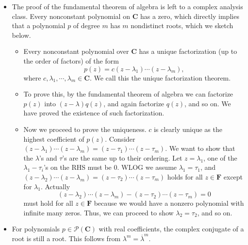 \documentclass[11pt]{article}
\newcommand{\C}{\mathbf{C}}
\newcommand{\F}{\mathbf{F}}
\newcommand{\conj}[1]{\overline{#1}}
\begin{document}
\begin{itemize}
    \item The proof of the fundamental theorem of algebra is left to a complex analysis class. Every nonconstant polynomial on $\C$ has a zero, which directly implies that a polynomial $p$ of degree $m$ has $m$ nondistinct roots, which we sketch below.
    \begin{itemize}
        \item Every nonconstant polynomial over $\C$ has a unique factorization (up to the order of factors) of the form 
        \begin{equation}
            p(z) = c(z - \lambda_1)\cdots(z-\lambda_m), \tag{$\star$}
        \end{equation}
        where $c, \lambda_1,\cdots,\lambda_m \in \C$. We call this the unique factorization theorem.
    \end{itemize}
    \begin{itemize}
        \item To prove this, by the fundamental theorem of algebra we can factorize $p(z)$ into $(z-\lambda)q(z)$, and again factorize $q(z)$, and so on. We have proved the existence of such factorization.
        \item Now we proceed to prove the uniqueness. $c$ is clearly unique as the highest coefficient of $p(z)$. Consider $(z - \lambda_1)\cdots(z-\lambda_m)=(z - \tau_1)\cdots(z-\tau_m)$. We want to show that the $\lambda$'s and $\tau$'s are the same up to their ordering. Let $z = \lambda_1$, one of the $\lambda_1 - \tau_i$'s on the RHS must be 0. WLOG we assume $\lambda_1 = \tau_1$, and $(z - \lambda_2)\cdots(z-\lambda_m)=(z - \tau_2)\cdots(z-\tau_m)$ holds for all $z \in \F$ except for $\lambda_1$. Actually $$(z - \lambda_2)\cdots(z-\lambda_m) - (z - \tau_2)\cdots(z-\tau_m) = 0$$ must hold for all $z \in \F$ because we would have a nonzero polynomial with infinite many zeros. Thus, we can proceed to show $\lambda_2 = \tau_2$, and so on.
    \end{itemize}
    \item For polynomials $p \in \mathcal{P}(\C)$ with real coefficients, the complex conjugate of a root is still a root. This follows from $\lambda^m = \conj{\lambda}^m$.
    

\end{itemize}
\end{document}
